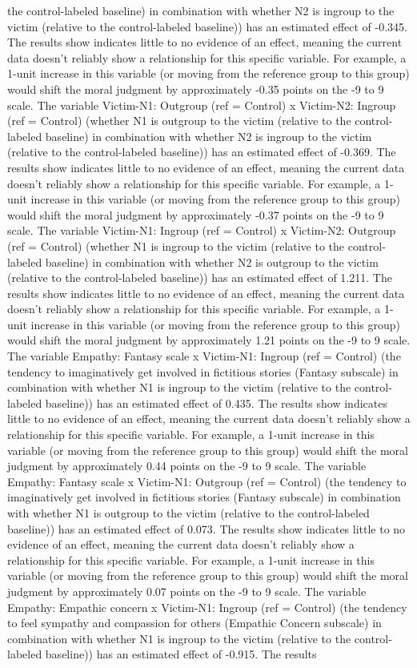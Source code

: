 \documentclass[11pt]{article}
\begin{document}
the control-labeled baseline) in combination with whether N2 is ingroup to the victim (relative to the control-labeled baseline)) has an estimated effect of -0.345. The results show indicates little to no evidence of an effect, meaning the current data doesn't reliably show a relationship for this specific variable. For example, a 1-unit increase in this variable (or moving from the reference group to this group) would shift the moral judgment by approximately -0.35 points on the -9 to 9 scale. The variable Victim-N1: Outgroup (ref = Control) x Victim-N2: Ingroup (ref = Control) (whether N1 is outgroup to the victim (relative to the control-labeled baseline) in combination with whether N2 is ingroup to the victim (relative to the control-labeled baseline)) has an estimated effect of -0.369. The results show indicates little to no evidence of an effect, meaning the current data doesn't reliably show a relationship for this specific variable. For example, a 1-unit increase in this variable (or moving from the reference group to this group) would shift the moral judgment by approximately -0.37 points on the -9 to 9 scale. The variable Victim-N1: Ingroup (ref = Control) x Victim-N2: Outgroup (ref = Control) (whether N1 is ingroup to the victim (relative to the control-labeled baseline) in combination with whether N2 is outgroup to the victim (relative to the control-labeled baseline)) has an estimated effect of 1.211. The results show indicates little to no evidence of an effect, meaning the current data doesn't reliably show a relationship for this specific variable. For example, a 1-unit increase in this variable (or moving from the reference group to this group) would shift the moral judgment by approximately 1.21 points on the -9 to 9 scale. The variable Empathy: Fantasy scale x Victim-N1: Ingroup (ref = Control) (the tendency to imaginatively get involved in fictitious stories (Fantasy subscale) in combination with whether N1 is ingroup to the victim (relative to the control-labeled baseline)) has an estimated effect of 0.435. The results show indicates little to no evidence of an effect, meaning the current data doesn't reliably show a relationship for this specific variable. For example, a 1-unit increase in this variable (or moving from the reference group to this group) would shift the moral judgment by approximately 0.44 points on the -9 to 9 scale. The variable Empathy: Fantasy scale x Victim-N1: Outgroup (ref = Control) (the tendency to imaginatively get involved in fictitious stories (Fantasy subscale) in combination with whether N1 is outgroup to the victim (relative to the control-labeled baseline)) has an estimated effect of 0.073. The results show indicates little to no evidence of an effect, meaning the current data doesn't reliably show a relationship for this specific variable. For example, a 1-unit increase in this variable (or moving from the reference group to this group) would shift the moral judgment by approximately 0.07 points on the -9 to 9 scale. The variable Empathy: Empathic concern x Victim-N1: Ingroup (ref = Control) (the tendency to feel sympathy and compassion for others (Empathic Concern subscale) in combination with whether N1 is ingroup to the victim (relative to the control-labeled baseline)) has an estimated effect of -0.915. The results 
\end{document}
